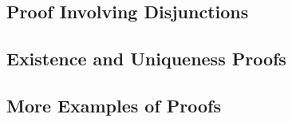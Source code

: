\documentclass{article}
\begin{document}
\subsection{Proof Involving Disjunctions} 
\subsection{Existence and Uniqueness Proofs}
\subsection{More Examples of Proofs}


\clearpage
\printglossary[type=\acronymtype,style=long]  %
\printglossary[type=symbolslist,style=long]   %
\printglossary[type=main]                     %
\end{document}
